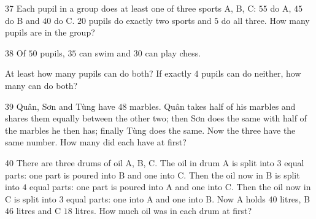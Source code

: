 \gap
\begin{probbox}{37}{}
Each pupil in a group does at least one of three sports A, B, C: $55$ do A, $45$ do B and $40$ do C. $20$ pupils do exactly two sports and $5$ do all three. How many pupils are in the group?
\end{probbox}
\gap
\begin{probbox}{38}{}
Of $50$ pupils, $35$ can swim and $30$ can play chess.\par
{} At least how many pupils can do both? \quad {} If exactly $4$ pupils can do neither, how many can do both?
\end{probbox}
\gap
\begin{probbox}{39}{}
Quân, Sơn and Tùng have $48$ marbles. Quân takes half of his marbles and shares them equally between the other two; then Sơn does the same with half of the marbles he then has; finally Tùng does the same. Now the three have the same number. How many did each have at first?
\end{probbox}
\gap
\begin{probbox}{40}{}
There are three drums of oil A, B, C. The oil in drum A is split into $3$ equal parts: one part is poured into B and one into C. Then the oil now in B is split into $4$ equal parts: one part is poured into A and one into C. Then the oil now in C is split into $3$ equal parts: one into A and one into B. Now A holds $40$ litres, B $46$ litres and C $18$ litres. How much oil was in each drum at first?
\end{probbox}
